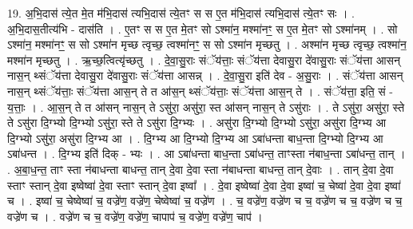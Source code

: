 \documentclass[17pt]{extarticle}
\begin{document}
19. अ॒भि॒दास॑ त्ये॒त मे॒त म॑भि॒दास॑ त्यभि॒दास॑ त्ये॒तꣳ स स ए॒त म॑भि॒दास॑ त्यभि॒दास॑ त्ये॒तꣳ सः । . अ॒भि॒दास॒तीत्य॑भि - दास॑ति । . ए॒तꣳ स स ए॒त मे॒तꣳ सो ऽश्मा॑न॒ मश्मा॑नꣳ॒॒ स ए॒त मे॒तꣳ सो ऽश्मा॑नम् । . सो ऽश्मा॑न॒ मश्मा॑नꣳ॒॒ स सो ऽश्मा॑न मृच्छ त्वृच्छ॒ त्वश्मा॑नꣳ॒॒ स सो ऽश्मा॑न मृच्छतु । . अश्मा॑न मृच्छ त्वृच्छ॒ त्वश्मा॑न॒ मश्मा॑न मृच्छतु । . ऋ॒च्छ॒त्वित्यृ॑च्छतु । . दे॒वा॒सु॒राः संॅय॑त्ताः॒ संॅय॑त्ता देवासु॒रा दे॑वासु॒राः संॅय॑त्ता आसन् नास॒न् थ्संॅय॑त्ता देवासु॒रा दे॑वासु॒राः संॅय॑त्ता आसन्न् । . दे॒वा॒सु॒रा इति॑ देव - अ॒सु॒राः । . संॅय॑त्ता आसन् नास॒न् थ्संॅय॑त्ताः॒ संॅय॑त्ता आस॒न् ते त आ॑स॒न् थ्संॅय॑त्ताः॒ संॅय॑त्ता आस॒न् ते । . संॅय॑त्ता॒ इति॒ सं - य॒त्ताः॒ । . आ॒स॒न् ते त आ॑सन् नास॒न् ते ऽसु॑रा॒ असु॑रा॒ स्त आ॑सन् नास॒न् ते ऽसु॑राः । . ते ऽसु॑रा॒ असु॑रा॒ स्ते ते ऽसु॑रा दि॒ग्भ्यो दि॒ग्भ्यो ऽसु॑रा॒ स्ते ते ऽसु॑रा दि॒ग्भ्यः । . असु॑रा दि॒ग्भ्यो दि॒ग्भ्यो ऽसु॑रा॒ असु॑रा दि॒ग्भ्य आ दि॒ग्भ्यो ऽसु॑रा॒ असु॑रा दि॒ग्भ्य आ । . दि॒ग्भ्य आ दि॒ग्भ्यो दि॒ग्भ्य आ ऽबा॑धन्ता बाध॒न्ता दि॒ग्भ्यो दि॒ग्भ्य आ ऽबा॑धन्त । . दि॒ग्भ्य इति॑ दिक् - भ्यः । . आ ऽबा॑धन्ता बाध॒न्ता ऽबा॑धन्त॒ ताꣳस्ता न॑बाध॒न्ता ऽबा॑धन्त॒ तान् । . अ॒बा॒ध॒न्त॒ ताꣳ स्ता न॑बाधन्ता बाधन्त॒ तान् दे॒वा दे॒वा स्ता न॑बाधन्ता बाधन्त॒ तान् दे॒वाः । . तान् दे॒वा दे॒वा स्ताꣳ स्तान् दे॒वा इष्वेष्वा॑ दे॒वा स्ताꣳ स्तान् दे॒वा इष्वा᳚ । . दे॒वा इष्वेष्वा॑ दे॒वा दे॒वा इष्वा॑ च॒ चेष्वा॑ दे॒वा दे॒वा इष्वा॑ च । . इष्वा॑ च॒ चेष्वेष्वा॑ च॒ वज्रे॑ण॒ वज्रे॑ण॒ चेष्वेष्वा॑ च॒ वज्रे॑ण । . च॒ वज्रे॑ण॒ वज्रे॑ण च च॒ वज्रे॑ण च च॒ वज्रे॑ण च च॒ वज्रे॑ण च । . वज्रे॑ण च च॒ वज्रे॑ण॒ वज्रे॑ण॒ चापाप॑ च॒ वज्रे॑ण॒ वज्रे॑ण॒ चाप॑ । \newline
\end{document}
